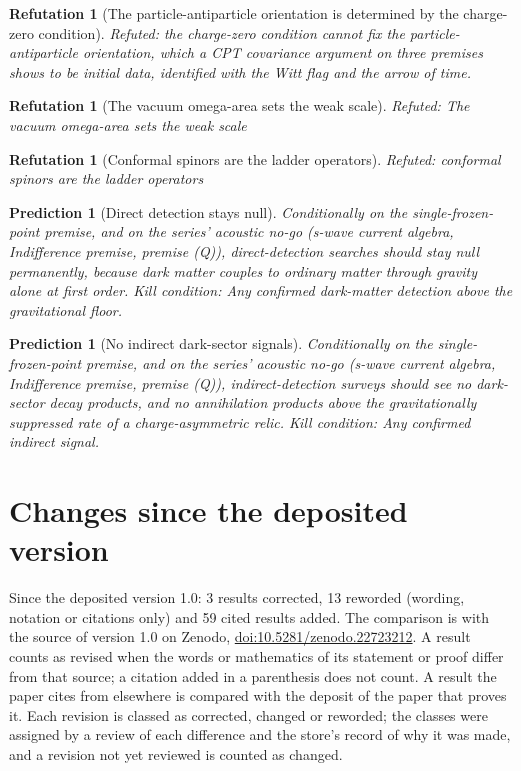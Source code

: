 \documentclass[11pt]{article}
\newtheorem{refutation}[theorem]{Refutation}
\newtheorem{prediction}[theorem]{Prediction}
\theoremstyle{definition}
\theoremstyle{plain}
\begin{document}
\begin{refutation}[The particle-antiparticle orientation is determined by the charge-zero condition]\label{c:refuted.the-particle-antiparticle-orientation-is-determi}
Refuted: the charge-zero condition cannot fix the particle-antiparticle orientation, which a CPT covariance argument on three premises shows to be initial data, identified with the Witt flag and the arrow of time.
\end{refutation}

\begin{refutation}[The vacuum omega-area sets the weak scale]\label{c:refuted.the-vacuum-omega-area-sets-the-weak-scale}
Refuted: The vacuum omega-area sets the weak scale
\end{refutation}

\begin{refutation}[Conformal spinors are the ladder operators]\label{c:refuted.twistors-are-the-ladder-operators}
Refuted: conformal spinors are the ladder operators
\end{refutation}

\begin{prediction}[Direct detection stays null]\label{c:pred.dark-matter-direct-detection-null}
Conditionally on the single-frozen-point premise, and on the series' acoustic no-go (s-wave current algebra, Indifference premise, premise (Q)), direct-detection searches should stay null permanently, because dark matter couples to ordinary matter through gravity alone at first order.
\emph{Kill condition:} Any confirmed dark-matter detection above the gravitational floor.
\end{prediction}

\begin{prediction}[No indirect dark-sector signals]\label{c:pred.no-indirect-dark-signals}
Conditionally on the single-frozen-point premise, and on the series' acoustic no-go (s-wave current algebra, Indifference premise, premise (Q)), indirect-detection surveys should see no dark-sector decay products, and no annihilation products above the gravitationally suppressed rate of a charge-asymmetric relic.
\emph{Kill condition:} Any confirmed indirect signal.
\end{prediction}

\section*{Changes since the deposited version}
Since the deposited version 1.0: 3 results corrected, 13 reworded (wording, notation or citations only) and 59 cited results added. The comparison is with the source of version 1.0 on Zenodo, \href{https://doi.org/10.5281/zenodo.22723212}{doi:10.5281/zenodo.22723212}. A result counts as revised when the words or mathematics of its statement or proof differ from that source; a citation added in a parenthesis does not count. A result the paper cites from elsewhere is compared with the deposit of the paper that proves it. Each revision is classed as corrected, changed or reworded; the classes were assigned by a review of each difference and the store's record of why it was made, and a revision not yet reviewed is counted as changed.
\end{document}
